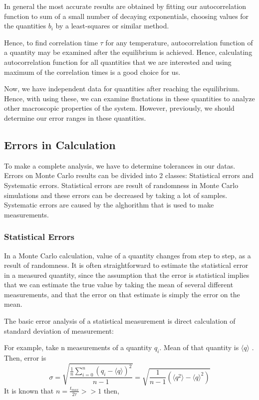 \documentclass[12pt,fleqn]{report}
\begin{document}
In general the most accurate results are obtained by fitting our autocorrelation function to sum of a small number of decaying exponentials, choosing values for the quantities $b_i$ by a least-squares or similar method.\cite[p. 67]{newman}

Hence, to find correlation time $\tau$ for any temperature, autocorrelation function of a quantity may be examined after the equilibrium is achieved. Hence, calculating autocorrelation function for all quantities that we are interested and using maximum of the correlation times is a good choice for us. 

Now, we have independent data for quantities after reaching the equilibrium. Hence, with using these, we can examine fluctations in these quantities to analyze other macroscopic properties of the system. However, previously, we should determine our error ranges in these quantities.

\subsection{Errors in Calculation}

To make a complete analysis, we have to determine tolerances in our datas. Errors on Monte Carlo results can be divided into 2 classes: Statistical errors and Systematic errors. Statistical errors are result of randomness in Monte Carlo simulations and these errors can be decreased by taking a lot of samples. Systematic errors are caused by the alghorithm that is used to make measurements.

\subsubsection{Statistical Errors}

In a Monte Carlo calculation, value of a quantity changes from step to step, 
as a result of randomness. It is often straightforward to estimate the 
statistical error in a measured quantity, since the assumption that the error 
is statistical implies that we can estimate the true value by taking the mean 
of several different measurements, and that the error on that estimate is 
simply the error on the mean. \cite[p. 68]{newman}

The basic error analysis of a statistical measurement is direct calculation of 
standard deviation of measurement: 

For example, take n measurements of a quantity $q_i$. Mean of that 
quantity is $\langle q \rangle$ . Then, error is 
\begin{equation}
\sigma = \sqrt{\frac{\frac{1}{n} \sum\limits_{i=0}^n (q_i - \langle q 
\rangle )^2}{n-1}} = \sqrt{\frac{1}{n-1} ( \langle q^2 \rangle - \langle 
q\rangle^2)}
\end{equation}
It is known that $n = \frac{t_{max}}{2\tau} >> 1$ then,
\end{document}
